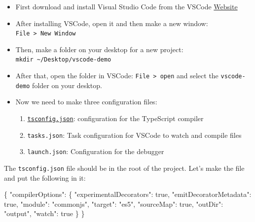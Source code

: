 \documentclass[12pt,]{article}
\newenvironment{Shaded}{}{}
\newcommand{\KeywordTok}[1]{\textcolor[rgb]{0.00,0.00,1.00}{{#1}}}
\newcommand{\StringTok}[1]{\textcolor[rgb]{0.00,0.50,0.50}{{#1}}}
\newcommand{\OperatorTok}[1]{{#1}}
\providecommand{\tightlist}{%
  \setlength{\itemsep}{0pt}\setlength{\parskip}{0pt}}
\begin{document}
\begin{itemize}
\item
  First download and install Visual Studio Code from the VSCode
  \href{https://code.visualstudio.com/}{Website}
\item
  After installing VSCode, open it and then make a new window:
  \texttt{File\ \textgreater{}\ New\ Window}
\item
  Then, make a folder on your desktop for a new project:
  \texttt{mkdir\ \textasciitilde{}/Desktop/vscode-demo}
\item
  After that, open the folder in VSCode:
  \texttt{File\ \textgreater{}\ open} and select the
  \texttt{vscode-demo} folder on your desktop.
\item
  Now we need to make three configuration files:

  \begin{enumerate}
  \def\labelenumi{\arabic{enumi}.}
  \tightlist
  \item
    \href{http://json.schemastore.org/tsconfig}{\texttt{tsconfig.json}}:
    configuration for the TypeScript compiler
  \item
    \texttt{tasks.json}: Task configuration for VSCode to watch and
    compile files
  \item
    \texttt{launch.json}: Configuration for the debugger
  \end{enumerate}
\end{itemize}

The \texttt{tsconfig.json} file should be in the root of the project.
Let's make the file and put the following in it:

\begin{Shaded}
\begin{Highlighting}[numbers=left,,]
\OperatorTok{\{}
  \StringTok{"compilerOptions"}\OperatorTok{:} \OperatorTok{\{}
    \StringTok{"experimentalDecorators"}\OperatorTok{:} \KeywordTok{true}\OperatorTok{,}
    \StringTok{"emitDecoratorMetadata"}\OperatorTok{:} \KeywordTok{true}\OperatorTok{,}
    \StringTok{"module"}\OperatorTok{:} \StringTok{"commonjs"}\OperatorTok{,}
    \StringTok{"target"}\OperatorTok{:} \StringTok{"es5"}\OperatorTok{,}
    \StringTok{"sourceMap"}\OperatorTok{:} \KeywordTok{true}\OperatorTok{,}
    \StringTok{"outDir"}\OperatorTok{:} \StringTok{"output"}\OperatorTok{,}
    \StringTok{"watch"}\OperatorTok{:} \KeywordTok{true}
  \OperatorTok{\}}
\OperatorTok{\}}
\end{Highlighting}
\end{Shaded}
\end{document}
